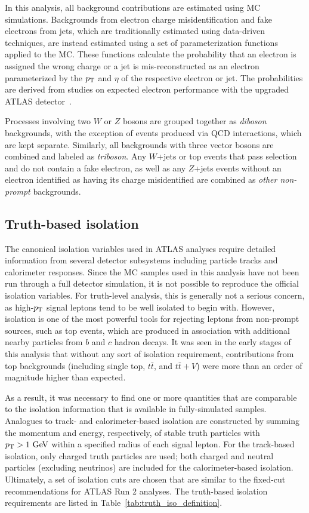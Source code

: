 In this analysis, all background contributions are estimated using MC simulations.
Backgrounds from electron charge misidentification and fake electrons from jets, which are traditionally estimated using data-driven techniques, are instead estimated using a set of parameterization functions applied to the MC.
These functions calculate the probability that an electron is assigned the wrong charge or a jet is mis-reconstructed as an electron parameterized by the $p_{\mathrm{T}}$ and $\eta$ of the respective electron or jet.
The probabilities are derived from studies on expected electron performance with the upgraded ATLAS detector~\cite{2016.upgrade-electron-performance}.

Processes involving two $W$ or $Z$ bosons are grouped together as \emph{diboson} backgrounds, with the exception of \ssww events produced via QCD interactions, which are kept separate.
Similarly, all backgrounds with three vector bosons are combined and labeled as \emph{triboson}.
Any $W$+jets or top events that pass selection and do not contain a fake electron, as well as any $Z$+jets events without an electron identified as having its charge misidentified are combined as \emph{other non-prompt} backgrounds.

\subsection{Truth-based isolation}\label{sswwupgrade:isolation}
The canonical isolation variables used in ATLAS analyses require detailed information from several detector subsystems including particle tracks and calorimeter responses.
Since the MC samples used in this analysis have not been run through a full detector simulation, it is not possible to reproduce the official isolation variables.
For truth-level analysis, this is generally not a serious concern, as high-$p_{\mathrm{T}}$ signal leptons tend to be well isolated to begin with.
However, isolation is one of the most powerful tools for rejecting leptons from non-prompt sources, such as top events, which are produced in association with additional nearby particles from $b$ and $c$ hadron decays.
It was seen in the early stages of this analysis that without any sort of isolation requirement, contributions from top backgrounds (including single top, $t\bar{t}$, and $t\bar{t}+V$) were more than an order of magnitude higher than expected.%

As a result, it was necessary to find one or more quantities that are comparable to the isolation information that is available in fully-simulated samples.
Analogues to track- and calorimeter-based isolation are constructed by summing the momentum and energy, respectively, of stable truth particles with $\pt > 1\gev$ within a specified radius of each signal lepton.
For the track-based isolation, only charged truth particles are used; both charged and neutral particles (excluding neutrinos) are included for the calorimeter-based isolation.
Ultimately, a set of isolation cuts are chosen that are similar to the fixed-cut recommendations for ATLAS Run 2 analyses.
The truth-based isolation requirements are listed in Table~\ref{tab:truth_iso_definition}.

